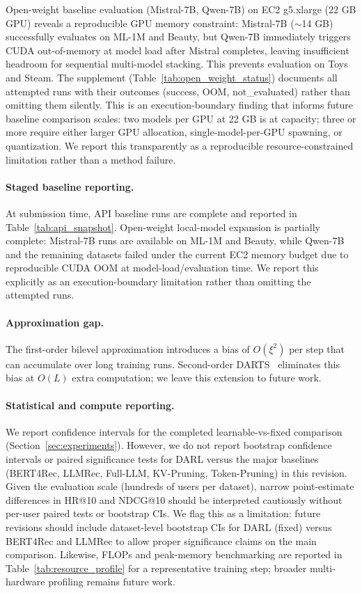 \documentclass[lettersize,journal]{IEEEtran}
\begin{document}
Open-weight baseline evaluation (Mistral-7B, Qwen-7B) on EC2 g5.xlarge 
(22 GB GPU) reveals a reproducible GPU memory constraint: Mistral-7B 
($\sim$14 GB) successfully evaluates on ML-1M and Beauty, but Qwen-7B 
immediately triggers CUDA out-of-memory at model load after Mistral 
completes, leaving insufficient headroom for sequential multi-model stacking. 
This prevents evaluation on Toys and Steam. The supplement 
(Table~\ref{tab:open_weight_status}) documents all attempted runs with their 
outcomes (success, OOM, not\_evaluated) rather than omitting them silently. 
This is an execution-boundary finding that informs future baseline comparison 
scales: two models per GPU at 22 GB is at capacity; three or more require 
either larger GPU allocation, single-model-per-GPU spawning, or quantization. 
We report this transparently as a reproducible resource-constrained limitation 
rather than a method failure.

\paragraph*{Staged baseline reporting.}
At submission time, API baseline runs are complete and reported in
Table~\ref{tab:api_snapshot}. Open-weight local-model expansion is partially
complete: Mistral-7B runs are available on ML-1M and Beauty, while Qwen-7B and
the remaining datasets failed under the current EC2 memory budget due to
reproducible CUDA OOM at model-load/evaluation time. We report this explicitly
as an execution-boundary limitation rather than omitting the attempted runs.

\paragraph*{Approximation gap.}
The first-order bilevel approximation introduces a bias of
$O(\xi^2)$ per step that can accumulate over long training runs.
Second-order DARTS~\cite{liu2019darts} eliminates this bias at
$O(L)$ extra computation; we leave this extension to future work.

\paragraph*{Statistical and compute reporting.}
We report confidence intervals for the completed learnable-vs-fixed
comparison (Section~\ref{sec:experiments}).
However, we do not report bootstrap confidence intervals or
paired significance tests for DARL versus the major baselines
(BERT4Rec, LLMRec, Full-LLM, KV-Pruning, Token-Pruning) in this
revision.
Given the evaluation scale (hundreds of users per dataset),
narrow point-estimate differences in HR@10 and NDCG@10 should be
interpreted cautiously without per-user paired tests or bootstrap CIs.
We flag this as a limitation: future revisions should include
dataset-level bootstrap CIs for DARL (fixed) versus BERT4Rec and
LLMRec to allow proper significance claims on the main comparison.
Likewise, FLOPs and peak-memory benchmarking are reported in
Table~\ref{tab:resource_profile} for a representative training step;
broader multi-hardware profiling remains future work.
\end{document}
